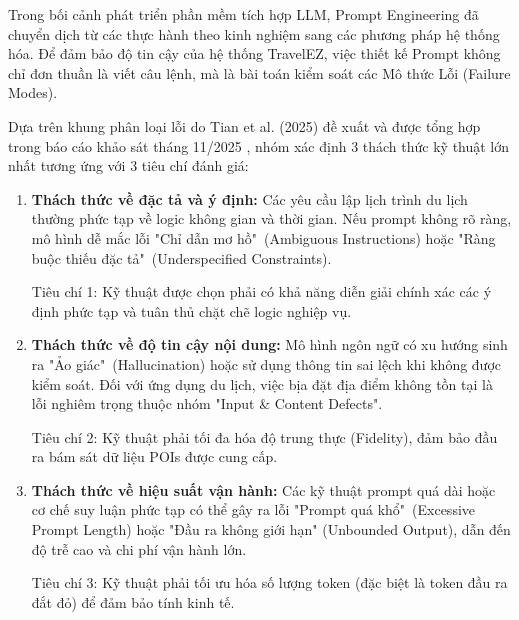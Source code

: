 

Trong bối cảnh phát triển phần mềm tích hợp LLM, Prompt Engineering đã chuyển dịch từ các thực hành theo kinh nghiệm sang các phương pháp hệ thống hóa. Để đảm bảo độ tin cậy của hệ thống TravelEZ, việc thiết kế Prompt không chỉ đơn thuần là viết câu lệnh, mà là bài toán kiểm soát các Mô thức Lỗi (Failure Modes).


Dựa trên khung phân loại lỗi do Tian et al. (2025) đề xuất và được tổng hợp trong báo cáo khảo sát tháng 11/2025 \cite{tian2025llm}, nhóm xác định 3 thách thức kỹ thuật lớn nhất tương ứng với 3 tiêu chí đánh giá:

\begin{enumerate}[label=\alph*., leftmargin=*]
    \item \textbf{Thách thức về đặc tả và ý định:} Các yêu cầu lập lịch trình du lịch thường phức tạp về logic không gian và thời gian. Nếu prompt không rõ ràng, mô hình dễ mắc lỗi "Chỉ dẫn mơ hồ"\ (Ambiguous Instructions) hoặc "Ràng buộc thiếu đặc tả"\ (Underspecified Constraints).
    
    Tiêu chí 1: Kỹ thuật được chọn phải có khả năng diễn giải chính xác các ý định phức tạp và tuân thủ chặt chẽ logic nghiệp vụ.
    
    \item \textbf{Thách thức về độ tin cậy nội dung:} Mô hình ngôn ngữ có xu hướng sinh ra "Ảo giác"\ (Hallucination) hoặc sử dụng thông tin sai lệch khi không được kiểm soát. Đối với ứng dụng du lịch, việc bịa đặt địa điểm không tồn tại là lỗi nghiêm trọng thuộc nhóm "Input \& Content Defects".
    
    Tiêu chí 2: Kỹ thuật phải tối đa hóa độ trung thực (Fidelity), đảm bảo đầu ra bám sát dữ liệu POIs được cung cấp.
    
    \item \textbf{Thách thức về hiệu suất vận hành:} Các kỹ thuật prompt quá dài hoặc cơ chế suy luận phức tạp có thể gây ra lỗi "Prompt quá khổ"\ (Excessive Prompt Length) hoặc "Đầu ra không giới hạn" (Unbounded Output), dẫn đến độ trễ cao và chi phí vận hành lớn.
    
    Tiêu chí 3: Kỹ thuật phải tối ưu hóa số lượng token (đặc biệt là token đầu ra đắt đỏ) để đảm bảo tính kinh tế.
\end{enumerate}

